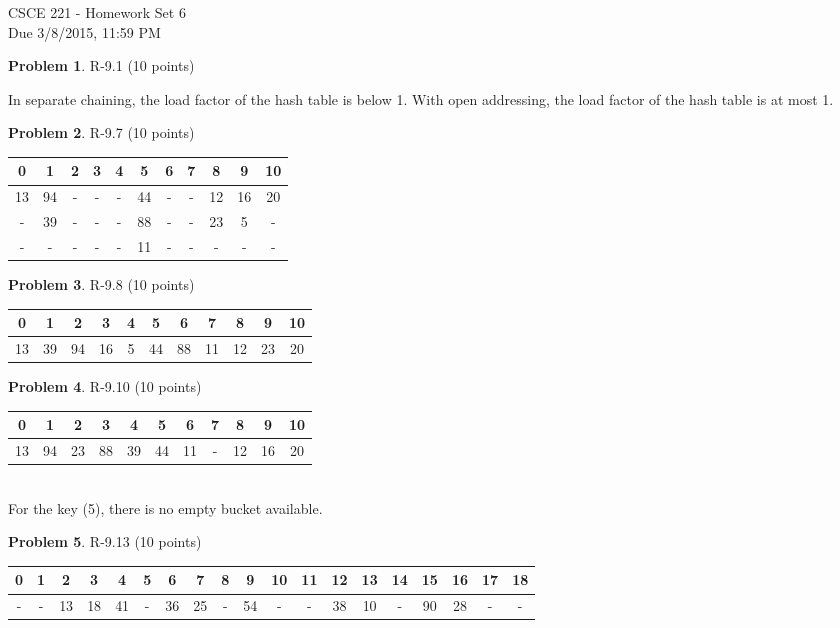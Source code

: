 \documentclass[12pt]{report}
\theoremstyle{definition}
\newtheorem{problem}{Problem}
\begin{document}
\vspace*{-15mm}
\begin{center}
{\large
				CSCE 221 - Homework Set 6 \\
				Due 3/8/2015, 11:59 PM}
\end{center}

\begin{problem} 	R-9.1 (10 points) 		
\end{problem}
				In separate chaining, the load factor of the hash table is below 1. With open addressing, the 				load factor of the hash table is at most 1.

\begin{problem} 	R-9.7 (10 points) 		
\end{problem}
				\begin{tabular}{|c|c|c|c|c|c|c|c|c|c|c|}
				\hline
				0&1&2&3&4&5&6&7&8&9&10 \\
				\hline
				13 & 94 & - & - & - & 44 & - & - & 12 & 16 & 20 \\
				- & 39 & - & - & - & 88 & - & - & 23 & 5 & - \\
				- & - & - & - & - & 11 & - & - & - & - & - \\
				\hline
				\end{tabular}

\begin{problem} 	R-9.8 (10 points) 		
\end{problem}
				\begin{tabular}{|c|c|c|c|c|c|c|c|c|c|c|}
				\hline
				0&1&2&3&4&5&6&7&8&9&10 \\
				\hline
				13 & 39 & 94 & 16 & 5 & 44 & 88 & 11 & 12 & 23 & 20 \\
				\hline
				\end{tabular}

\begin{problem} 	R-9.10 (10 points) 		
\end{problem}
				\begin{tabular}{|c|c|c|c|c|c|c|c|c|c|c|}
				\hline
				0&1&2&3&4&5&6&7&8&9&10 \\
				\hline
				13 & 94 & 23 & 88 & 39 & 44 & 11 & - & 12 & 16 & 20 \\
				\hline
				\end{tabular} \\
				
				For the key (5), there is no empty bucket available. 

\begin{problem} 	R-9.13 (10 points) 		
\end{problem}
				\begin{tabular}{|c|c|c|c|c|c|c|c|c|c|c|c|c|c|c|c|c|c|c|}
				\hline
				0&1&2&3&4&5&6&7&8&9&10&11&12&13&14&15&16&17&18 \\
				\hline
				- & - & 13 & 18 & 41 & - & 36 & 25 & - & 54 & - & - & 38 & 10 & - & 90 & 28 & - & -\\
				\hline
				\end{tabular} \\
\end{document}
